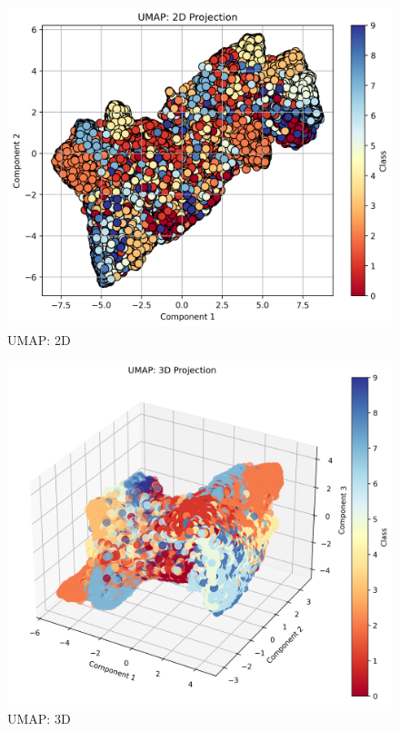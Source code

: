 \documentclass[journal]{IEEEtran}
\begin{document}
\begin{figure}[hbt!]
        \centering
        \includegraphics[width=0.9\linewidth]{figures/umap_2d_projection.png}
        \caption{UMAP: 2D}
        \label{fig:umap_2d}
\end{figure}
\vspace{-10pt}
\begin{figure}[H]
        \centering
        \includegraphics[width=0.9\linewidth]{figures/umap_3d_projection.png}
        \caption{UMAP: 3D}
        \label{fig:umap_3d}
\end{figure}
\end{document}
